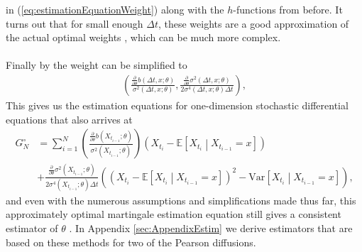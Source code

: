 in (\ref{eq:estimationEquationWeight}) along with the $h$-functions from before. It turns out that for small enough $\Delta t$, these weights are a good approximation of the actual optimal weights \cite[equation (1.32)]{StatisticalMethodsForSDE}, which can be much more complex.\\\\
Finally by \cite[lemma 1.10]{StatisticalMethodsForSDE} the weight can be simplified to
\begin{align}
    \left(\frac{\frac{\partial}{\partial\theta}b(\Delta t, x;\theta)}{\sigma^2\left(\Delta t, x; \theta\right)} , \frac{\frac{\partial}{\partial\theta}\sigma^2(\Delta t, x;\theta)}{2\sigma^4(\Delta t, x;\theta)\Delta t} \right),
\end{align}
This gives us the estimation equations for one-dimension stochastic differential equations that \cite[Example 1.11]{StatisticalMethodsForSDE} also arrives at
\begin{align}
    G_N^{\circ} &= \sum_{i = 1}^N 
    \left(
        \frac{\frac{\partial}{\partial\theta} b\left(X_{t_{i-1}};\theta\right)}{\sigma^2\left(X_{t_{i-1}};\theta\right)}
    \right) \left(X_{t_{i}} - \mathbb{E}\left[X_{t_{i}} \middle| X_{t_{i-1}} = x\right]\right) \nonumber \\
    &+ \frac{\frac{\partial}{\partial\theta}\sigma^2\left(X_{t_{i-1}}; \theta\right)}{2\sigma^4\left(X_{t_{i - 1}}; \theta\right)\Delta t}\left(\left(X_{t_{i}} - \mathbb{E}\left[X_{t_{i}} \middle| X_{t_{i-1}} = x\right]\right)^2 - \textrm{Var}\left[X_{t_{i}} \middle| X_{t_{i-1}} = x\right]\right),\label{eq:approximatelyOptimalMartingale}
\end{align}
and even with the numerous assumptions and simplifications made thus far, this approximately optimal martingale estimation equation still gives a consistent estimator of $\theta$ \cite[p.19]{StatisticalMethodsForSDE}. In Appendix \ref{sec:AppendixEstim} we derive estimators that are based on these methods for two of the Pearson diffusions.
